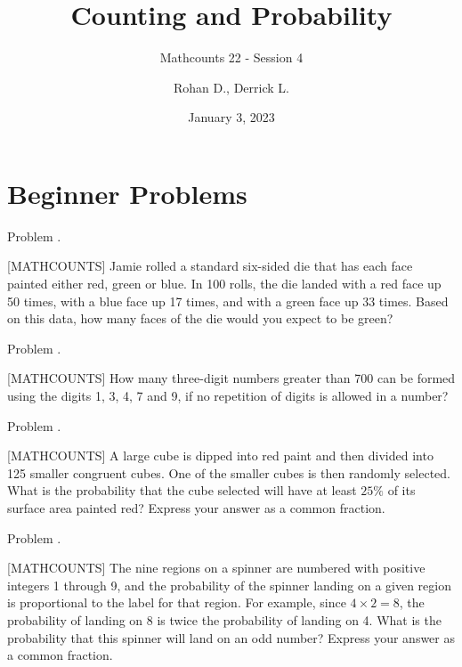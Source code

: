 \documentclass[9pt]{beamer}
\title{Counting and Probability}
\subtitle{Mathcounts 22 - Session 4}
\author{Rohan D., Derrick L.}
\institute{BISV Mathcounts Club 22}
\date{January 3, 2023}
\newcounter{problem}[section]
\begin{document}
\begin{frame}
    \titlepage        
\end{frame}

\setcounter{section}{4}

\section{Beginner Problems}
\begin{frame}[t, fragile]{Problem \thesection.\theproblem}
    \begin{block}{}[MATHCOUNTS]
    Jamie rolled a standard six-sided die that has each face painted either red, green or blue. In 100 rolls, the die landed with a red face up 50 times, with a blue face up 17 times, and with a green face up 33 times. Based on this data, how many faces of the die would you expect to be green?
	
    \end{block}
\end{frame}

\begin{frame}[t, fragile]{Problem \thesection.\theproblem}
    \begin{block}{}[MATHCOUNTS]
  How many three-digit numbers greater than 700 can be formed using the digits 1, 3, 4, 7 and 9, if no repetition of digits is allowed in a number?
	
    \end{block}
\end{frame}

\begin{frame}[t, fragile]{Problem \thesection.\theproblem}
    \begin{block}{}[MATHCOUNTS]
 A large cube is dipped into red paint and then divided into 125 smaller congruent cubes. One of the smaller cubes is then randomly selected. What is the probability that the cube selected will have at least $25\%$ of its surface area painted red? Express your answer as a common fraction.
 
    \end{block}
\end{frame}

\begin{frame}[t, fragile]{Problem \thesection.\theproblem}
    \begin{block}{}[MATHCOUNTS]
    The nine regions on a spinner are numbered with positive integers 1 through 9, and the probability of the spinner landing on a given region is proportional to the label for that region. For example, since $4 \times 2 = 8$, the probability of landing on 8 is twice the probability of landing on 4. What is the probability that this spinner will land on an odd number? Express your answer as a common fraction.
	
    \end{block}
\end{frame}
\end{document}

